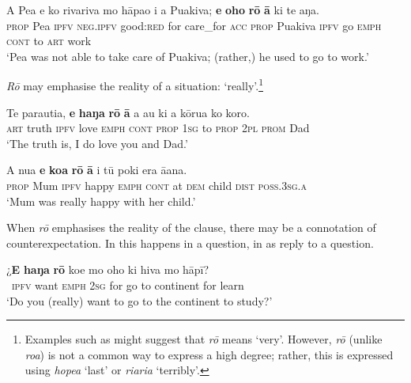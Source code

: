 \ea\label{ex:7.115}
\gll A Pea e ko rivariva mo hāpa{\ꞌ}o i a Puakiva;  \textbf{e} \textbf{oho} \textbf{rō} \textbf{{\ꞌ}ā} ki te aŋa.\\
\textsc{prop} Pea \textsc{ipfv} \textsc{neg.ipfv} good:\textsc{red} for care\_for \textsc{acc} \textsc{prop} Puakiva  \textsc{ipfv} go \textsc{emph} \textsc{cont} to \textsc{art} work\\

\glt
‘Pea was not able to take care of Puakiva; (rather,) he used to go to work.’ \textstyleExampleref{[R229.005]} 
\z

\textit{Rō} may emphasise the reality of a situation: ‘really’.\footnote{\label{fn:349}Examples such as  might suggest that \textit{rō} means ‘very’. However, \textit{rō} (unlike  \textit{roa}) is not a common way to express a high degree; rather, this is expressed using \textit{hope{\ꞌ}a} ‘last’ or \textit{ri{\ꞌ}ari{\ꞌ}a} ‘terribly’.}

\ea\label{ex:7.116}
\gll Te parauti{\ꞌ}a, \textbf{e} \textbf{haŋa} \textbf{rō} \textbf{{\ꞌ}ā} a au ki a kōrua ko koro. \\
\textsc{art} truth \textsc{ipfv} love \textsc{emph} \textsc{cont} \textsc{prop} \textsc{1sg} to \textsc{prop} \textsc{2pl} \textsc{prom} Dad \\

\glt 
‘The truth is, I do love you and Dad.’ \textstyleExampleref{[R229.498]} 
\z

\ea\label{ex:7.117}
\gll A nua \textbf{e} \textbf{koa} \textbf{rō} \textbf{{\ꞌ}ā} {\ꞌ}i tū poki era {\ꞌ}ā{\ꞌ}ana. \\
\textsc{prop} Mum \textsc{ipfv} happy \textsc{emph} \textsc{cont} at \textsc{dem} child \textsc{dist} \textsc{poss.3sg.a} \\

\glt
‘Mum was really happy with her child.’ \textstyleExampleref{[R250.055]} 
\z

When \textit{rō} emphasises the reality of the clause, there may be a connotation of counterexpectation. In  this happens in a question, in  as reply to a question.

\ea\label{ex:7.118}
\gll ¿\textbf{E} \textbf{haŋa} \textbf{rō} koe mo oho ki hiva mo hāpī? \\
~\textsc{ipfv} want \textsc{emph} \textsc{2sg} for go to continent for learn \\

\glt 
‘Do you (really) want to go to the continent to study?’ \textstyleExampleref{[R210.010]} 
\z

